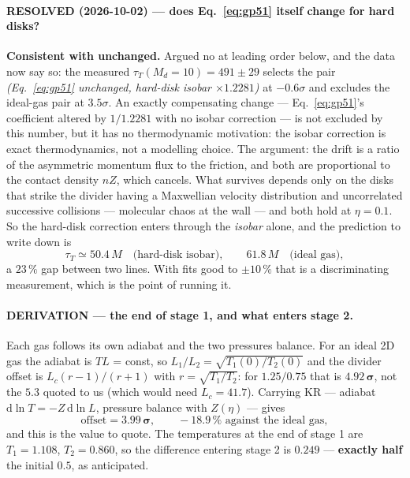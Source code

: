 \documentclass[11pt,a4paper]{article}
\newcommand{\dd}{\mathrm{d}}
\begin{document}
\paragraph{RESOLVED (2026-10-02) --- does Eq.~\eqref{eq:gp51} itself change for hard disks?}
\textbf{Consistent with unchanged.} Argued no at leading order below, and the data now say so:
the measured $\tau_T(M_d=10) = 491 \pm 29$ selects the pair \emph{(Eq.~\eqref{eq:gp51} unchanged,
hard-disk isobar $\times 1.2281$)} at $-0.6\sigma$ and excludes the ideal-gas pair at $3.5\sigma$.
An exactly compensating change --- Eq.~\eqref{eq:gp51}'s coefficient altered by $1/1.2281$ with no
isobar correction --- is not excluded by this number, but it has no thermodynamic motivation: the
isobar correction is exact thermodynamics, not a modelling choice. The argument: the drift is a ratio of the asymmetric momentum
flux to the friction, and both are proportional to the contact density $nZ$, which cancels. What
survives depends only on the disks that strike the divider having a Maxwellian velocity
distribution and uncorrelated successive collisions --- molecular chaos at the wall --- and both
hold at $\eta = 0.1$. So the hard-disk correction enters through the \emph{isobar} alone, and the
prediction to write down is
\begin{equation}
\tau_T \simeq 50.4\,M\quad\text{(hard-disk isobar)},\qquad 61.8\,M\quad\text{(ideal gas)} ,
\end{equation}
a $23\,\%$ gap between two lines. With fits good to $\pm10\,\%$ that is a discriminating
measurement, which is the point of running it.

\paragraph{DERIVATION --- the end of stage 1, and what enters stage 2.} Each gas follows its own
adiabat and the two pressures balance. For an ideal 2D gas the adiabat is $TL$ = const, so
$L_1/L_2 = \sqrt{T_1(0)/T_2(0)}$ and the divider offset is $L_c(r-1)/(r+1)$ with
$r = \sqrt{T_1/T_2}$: for $1.25/0.75$ that is $\mathbf{4.92\,\sigma}$, not the $5.3$ quoted to us
(which would need $L_c = 41.7$). Carrying KR --- adiabat $\dd\ln T = -Z\,\dd\ln L$, pressure balance
with $Z(\eta)$ --- gives
\begin{equation}
\text{offset} = \mathbf{3.99\,\sigma},\qquad -18.9\,\% \text{ against the ideal gas},
\end{equation}
and this is the value to quote. The temperatures at the end of stage 1 are $T_1 = 1.108$,
$T_2 = 0.860$, so the difference entering stage 2 is $0.249$ --- \textbf{exactly half} the initial
$0.5$, as anticipated.
\end{document}
